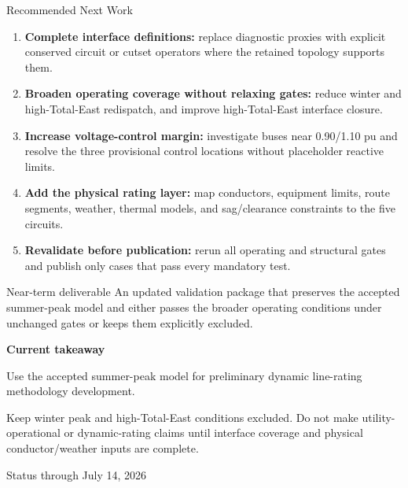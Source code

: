 \documentclass[aspectratio=169,10pt]{beamer}
\begin{document}
\begin{frame}{Recommended Next Work}
\begin{enumerate}
  \item \textbf{Complete interface definitions:} replace diagnostic proxies with explicit conserved circuit or cutset operators where the retained topology supports them.
  \item \textbf{Broaden operating coverage without relaxing gates:} reduce winter and high-Total-East redispatch, and improve high-Total-East interface closure.
  \item \textbf{Increase voltage-control margin:} investigate buses near 0.90/1.10 pu and resolve the three provisional control locations without placeholder reactive limits.
  \item \textbf{Add the physical rating layer:} map conductors, equipment limits, route segments, weather, thermal models, and sag/clearance constraints to the five circuits.
  \item \textbf{Revalidate before publication:} rerun all operating and structural gates and publish only cases that pass every mandatory test.
\end{enumerate}

\begin{exampleblock}{Near-term deliverable}
An updated validation package that preserves the accepted summer-peak model and either passes the broader operating conditions under unchanged gates or keeps them explicitly excluded.
\end{exampleblock}
\end{frame}

\begin{frame}[plain]
\vspace{1.18cm}
{\color{white}\Huge\bfseries Current takeaway\par}
\vspace{0.65cm}
{\color{paleblue}\Large Use the accepted summer-peak model for preliminary dynamic line-rating methodology development.\par}
\vspace{0.45cm}
{\color{white}\large Keep winter peak and high-Total-East conditions excluded. Do not make utility-operational or dynamic-rating claims until interface coverage and physical conductor/weather inputs are complete.\par}
\vfill
{\color{paleblue}\small Status through July 14, 2026}
\end{frame}
\end{document}
